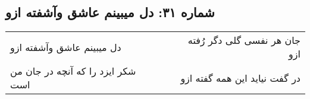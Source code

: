 \begin{center}
\section*{شماره ۳۱: دل میبینم عاشق وآشفته ازو}
\label{sec:031}
\begin{longtable}{l p{0.5cm} r}
دل میبینم عاشق وآشفته ازو
&&
جان هر نفسی گلی دگر رُفته ازو
\\
شکر ایزد را که آنچه در جان من است
&&
در گفت نیاید این همه گفته ازو
\\
\end{longtable}
\end{center}
